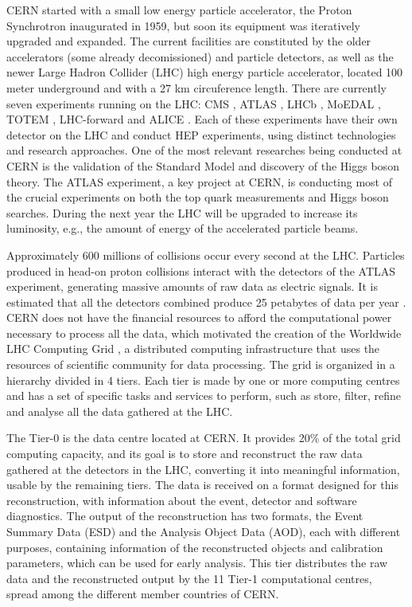 CERN started with a small low energy particle accelerator, the Proton Synchrotron \cite{CERN:PS} inaugurated in 1959, but soon its equipment was iteratively upgraded and expanded. The current facilities are constituted by the older accelerators (some already decomissioned) and particle detectors, as well as the newer Large Hadron Collider (LHC) \cite{CERN:LHC} high energy particle accelerator, located 100 meter underground and with a 27 km circuference length. There are currently seven experiments running on the LHC: CMS \cite{CERN:CMS}, ATLAS \cite{CERN:ATLAS}, LHCb \cite{CERN:LHCb}, MoEDAL \cite{CERN:MoEDAL}, TOTEM \cite{CERN:TOTEM}, LHC-forward \cite{CERN:LHCf} and ALICE \cite{CERN:ALICE}. Each of these experiments have their own detector on the LHC and conduct HEP experiments, using distinct technologies and research approaches. One of the most relevant researches being conducted at CERN is the validation of the Standard Model and discovery of the Higgs boson theory. The ATLAS experiment, a key project at CERN, is conducting most of the crucial experiments on both the top quark measurements and Higgs boson searches. During the next year the LHC will be upgraded to increase its luminosity, e.g., the amount of energy of the accelerated particle beams.

Approximately 600 millions of collisions occur every second at the LHC. Particles produced in head-on proton collisions interact with the detectors of the ATLAS experiment, generating massive amounts of raw data as electric signals. It is estimated that all the detectors combined produce 25 petabytes of data per year \cite{CERN:DATA1,CERN:DATA2}. CERN does not have the financial resources to afford the computational power necessary to process all the data, which motivated the creation of the Worldwide LHC Computing Grid \cite{CERN:WLHCCG}, a distributed computing infrastructure that uses the resources of scientific community for data processing. The grid is organized in a hierarchy divided in 4 tiers. Each tier is made by one or more computing centres and has a set of specific tasks and services to perform, such as store, filter, refine and analyse all the data gathered at the LHC.

The Tier-0 is the data centre located at CERN. It provides 20\% of the total grid computing capacity, and its goal is to store and reconstruct the raw data gathered at the detectors in the LHC, converting it into meaningful information, usable by the remaining tiers. The data is received on a format designed for this reconstruction, with information about the event, detector and software diagnostics. The output of the reconstruction has two formats, the Event Summary Data (ESD) and the Analysis Object Data (AOD), each with different purposes, containing information of the reconstructed objects and calibration parameters, which can be used for early analysis. This tier distributes the raw data and the reconstructed output by the 11 Tier-1 computational centres, spread among the different member countries of CERN.


